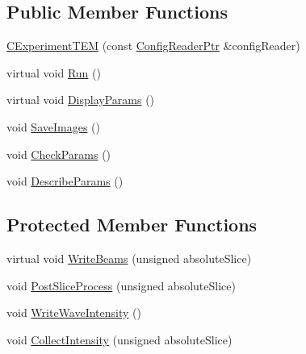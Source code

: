 \subsection*{Public Member Functions}
\begin{DoxyCompactItemize}
\item 
\hyperlink{class_q_s_t_e_m_1_1_c_experiment_t_e_m_aea03e0f75b82eb46e9de44a50b5dc919}{C\-Experiment\-T\-E\-M} (const \hyperlink{namespace_q_s_t_e_m_af9424707fe9f6503298f49b41304bd35}{Config\-Reader\-Ptr} \&config\-Reader)
\item 
virtual void \hyperlink{class_q_s_t_e_m_1_1_c_experiment_t_e_m_ac21a18cdcc38c7b1c85a118b94b502cd}{Run} ()
\item 
virtual void \hyperlink{class_q_s_t_e_m_1_1_c_experiment_t_e_m_a363cbbdac32f3f41a53b8c9465eab647}{Display\-Params} ()
\item 
void \hyperlink{class_q_s_t_e_m_1_1_c_experiment_t_e_m_a1560b9f1ca73536a984da870fbb31979}{Save\-Images} ()
\item 
void \hyperlink{class_q_s_t_e_m_1_1_c_experiment_t_e_m_a5a261bed060c2891394133a0e7d50ae2}{Check\-Params} ()
\item 
void \hyperlink{class_q_s_t_e_m_1_1_c_experiment_t_e_m_ad72523267e6ceea59370b48b29d3b16c}{Describe\-Params} ()
\end{DoxyCompactItemize}
\subsection*{Protected Member Functions}
\begin{DoxyCompactItemize}
\item 
virtual void \hyperlink{class_q_s_t_e_m_1_1_c_experiment_t_e_m_a176911c21e4533c77e43b31a5d4fc52b}{Write\-Beams} (unsigned absolute\-Slice)
\item 
void \hyperlink{class_q_s_t_e_m_1_1_c_experiment_t_e_m_a3072e66e466cbac690b953465b9697e8}{Post\-Slice\-Process} (unsigned absolute\-Slice)
\item 
void \hyperlink{class_q_s_t_e_m_1_1_c_experiment_t_e_m_a264e57d513f688ba34346261341c4f33}{Write\-Wave\-Intensity} ()
\item 
void \hyperlink{class_q_s_t_e_m_1_1_c_experiment_t_e_m_aa43328ecd2b6e74811ff19bbbf8db200}{Collect\-Intensity} (unsigned absolute\-Slice)
\end{DoxyCompactItemize}
